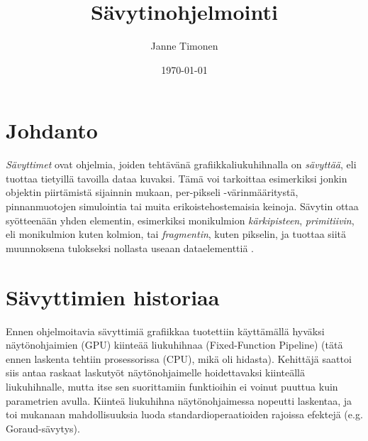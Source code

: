 \documentclass[finnish]{tktltiki2}
\title{Sävytinohjelmointi}
\author{Janne Timonen}
\date{\today}
\theoremstyle{definition}
\theoremstyle{remark}
\begin{document}

\frontmatter      %

\maketitle        %
\makeabstract     %

\tableofcontents  %


\mainmatter       %

\section{Johdanto}


\emph{Sävyttimet} ovat ohjelmia, joiden tehtävänä grafiikkaliukuhihnalla on \emph{sävyttää}, eli tuottaa tietyillä tavoilla dataa kuvaksi. Tämä voi tarkoittaa esimerkiksi jonkin objektin piirtämistä sijainnin mukaan, per-pikseli -värinmääritystä, pinnanmuotojen simulointia tai muita erikoistehostemaisia keinoja. Sävytin ottaa syötteenään yhden elementin, esimerkiksi monikulmion \emph{kärkipisteen}, \emph{primitiivin}, eli monikulmion kuten kolmion, tai \emph{fragmentin}, kuten pikselin, ja tuottaa siitä muunnoksena tulokseksi nollasta useaan dataelementtiä \cite{Gre14}. 

\section{Sävyttimien historiaa}

Ennen ohjelmoitavia sävyttimiä grafiikkaa tuotettiin käyttämällä hyväksi näytönohjaimien (GPU) kiinteää liukuhihnaa (Fixed-Function Pipeline) (tätä ennen laskenta tehtiin prosessorissa (CPU), mikä oli hidasta). Kehittäjä saattoi siis antaa raskaat laskutyöt näytönohjaimelle hoidettavaksi kiinteällä liukuhihnalle, mutta itse sen suorittamiin funktioihin ei voinut puuttua kuin parametrien avulla. Kiinteä liukuhihna näytönohjaimessa nopeutti laskentaa, ja toi mukanaan mahdollisuuksia luoda standardioperaatioiden rajoissa efektejä (e.g. Goraud-sävytys).
\end{document}
